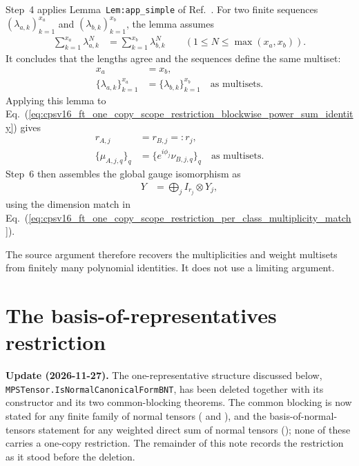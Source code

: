 \documentclass{article}
\begin{document}
Step~4 applies Lemma~\texttt{Lem:app\_simple} of
Ref.~\cite{Cirac2016MPDO_arXiv}. For two finite sequences
$(\lambda_{a,k})_{k=1}^{x_a}$ and
$(\lambda_{b,k})_{k=1}^{x_b}$, the lemma assumes
\begin{align}
    \sum_{k=1}^{x_a}\lambda_{a,k}^N
        &= \sum_{k=1}^{x_b}\lambda_{b,k}^N
        \qquad
        (1\leq N\leq\max(x_a,x_b)).
    \label{eq:cpsv16_ft_one_copy_scope_restriction_finite_power_sum_hypothesis}
\end{align}
It concludes that the lengths agree and the sequences define the same
multiset:
\begin{align}
    x_a
        &=x_b,
    \label{eq:cpsv16_ft_one_copy_scope_restriction_power_sum_cardinality}\\
    \{\lambda_{a,k}\}_{k=1}^{x_a}
        &=\{\lambda_{b,k}\}_{k=1}^{x_b}
        \quad\text{as multisets}.
    \label{eq:cpsv16_ft_one_copy_scope_restriction_power_sum_multiset}
\end{align}
Applying this lemma to
Eq.~(\ref{eq:cpsv16_ft_one_copy_scope_restriction_blockwise_power_sum_identity})
gives
\begin{align}
    r_{A,j}
        &=r_{B,j}=:r_j,
    \label{eq:cpsv16_ft_one_copy_scope_restriction_per_class_multiplicity_match}\\
    \{\mu_{A,j,q}\}_q
        &=\{e^{i\phi_j}\nu_{B,j,q}\}_q
        \quad\text{as multisets}.
    \label{eq:cpsv16_ft_one_copy_scope_restriction_per_class_weight_match}
\end{align}
Step~6 then assembles the global gauge isomorphism as
\begin{align}
    Y
        &=\bigoplus_jI_{r_j}\otimes Y_j,
    \label{eq:cpsv16_ft_one_copy_scope_restriction_source_global_gauge}
\end{align}
using the dimension match in
Eq.~(\ref{eq:cpsv16_ft_one_copy_scope_restriction_per_class_multiplicity_match}).

The source argument therefore recovers the multiplicities and weight multisets
from finitely many polynomial identities. It does not use a limiting argument.

\section{The basis-of-representatives restriction}

\textbf{Update (2026-11-27).} The one-representative structure discussed below,
\texttt{MPSTensor.IsNormalCanonicalFormBNT}, has been deleted together with its
constructor and its two common-blocking theorems. The common blocking is now
stated for any finite family of normal tensors
( and
), and the
basis-of-normal-tensors statement for any weighted direct sum of normal tensors
(); none of
these carries a one-copy restriction. The remainder of this note records the
restriction as it stood before the deletion.
\end{document}
